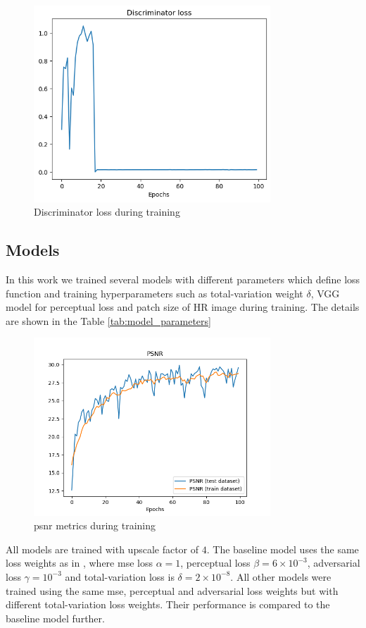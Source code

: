 \documentclass[conference]{IEEEtran}
\begin{document}
\begin{figure}[b]
	\centering
    \centerline{\includegraphics[width=8.9cm]{results/d_loss}}
	\caption{Discriminator loss during training}
	\label{fig:discriminator_training_loss}
\end{figure}

\subsection{Models}

In this work we trained several models with different parameters which define loss function and training hyperparameters such as total-variation weight $\delta$, VGG model for perceptual loss and patch size of HR image during training. The details are shown in the Table \ref{tab:model_parameters}

\begin{figure}[b]
	\centering
    \centerline{\includegraphics[width=8.9cm]{results/train_psnr}}
	\caption{\acrshort{psnr} metrics during training}
	\label{fig:model_training_metrics}
\end{figure}

All models are trained with upscale factor of $4$. The baseline model uses the same loss weights as in \cite{iSeeBetter_2020}, where \acrshort{mse} loss $\alpha=1$, perceptual loss $\beta=6 \times 10^{-3}$, adversarial loss $\gamma=10^{-3}$ and total-variation loss is $\delta=2 \times 10^{-8}$. All other models were trained using the same \acrshort{mse}, perceptual and adversarial loss weights but with different total-variation loss weights. Their performance is compared to the baseline model further.
\end{document}
